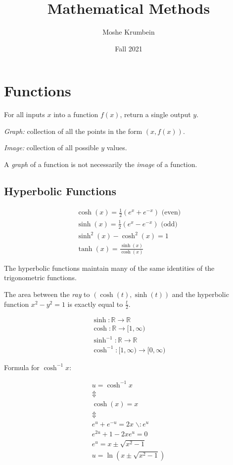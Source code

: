 \documentclass[00_complete]{subfiles}
\title{Mathematical Methods}
\author{Moshe Krumbein}
\date{Fall 2021}
\begin{document}

\section{Functions}

\begin{definition}
For all inputs $x$ into a function $f(x)$, return a single output $y$.

\emph{Graph:} collection of all the points in the form $(x,f(x))$.

\emph{Image:} collection of all possible $y$ values.
\begin{note}
    A \emph{graph} of a function is not necessarily the \emph{image} of a function.
\end{note}
\end{definition}

\subsection{Hyperbolic Functions}

$$
\begin{gathered}
    \cosh(x)=\frac{1}{2}\left(e^x+e^{-x}\right) \text{ (even)} \\
    \sinh(x)=\frac{1}{2}\left(e^x-e^{-x}\right) \text{ (odd)} \\
    \sinh^2(x)-\cosh^2(x) = 1\\
    \tanh(x) = \frac{\sinh(x)}{\cosh(x)}
\end{gathered}
$$

The hyperbolic functions maintain many of the same identities of the
trigonometric functions.

The area between the \emph{ray} to $(\cosh(t), \sinh(t))$ and the hyperbolic
function $x^2-y^2 = 1$ is exactly equal to $\frac{t}{2}$.

$$
\begin{gathered}
    \sinh: \mathbb{R} \to \mathbb{R} \\
    \cosh: \mathbb{R} \to [1, \infty) \\
    \sinh^{-1}: \mathbb{R} \to \mathbb{R} \\
    \cosh^{-1}: [1, \infty) \to [0, \infty)
\end{gathered}
$$

Formula for $\cosh^{-1}x$:

$$
\begin{gathered}
    u = \cosh^{-1}x \\
    \Updownarrow \\
    \cosh(x) = x \\ \Updownarrow \\
    e^u + e^{-u} =2x \; \backslash : e^u\\
    e^{2u} + 1 - 2xe^u = 0 \\
    e^u = x \pm \sqrt{x^2-1} \\
    u = \ln(x\pm\sqrt{x^2-1}) \\
\end{gathered}
$$
\end{document}
